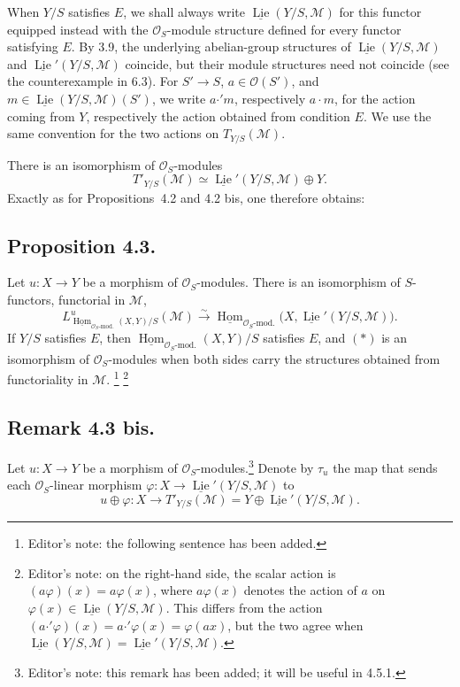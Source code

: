 When \(Y/S\) satisfies \(E\), we shall always write
\(\underline{\operatorname{Lie}}(Y/S,\mathcal M)\) for this functor
equipped instead with the \(\mathcal O_S\)-module structure defined for
every functor satisfying \(E\). By 3.9, the underlying abelian-group
structures of
\(\underline{\operatorname{Lie}}(Y/S,\mathcal M)\) and
\(\underline{\operatorname{Lie}}'(Y/S,\mathcal M)\) coincide, but their
module structures need not coincide (see the counterexample in 6.3). For
\(S'\to S\), \(a\in\mathcal O(S')\), and
\(m\in\underline{\operatorname{Lie}}(Y/S,\mathcal M)(S')\), we write
\(a\mathbin{\cdot'}m\), respectively \(a\cdot m\), for the action coming
from \(Y\), respectively the action obtained from condition \(E\). We use
the same convention for the two actions on \(T_{Y/S}(\mathcal M)\).

There is an isomorphism of \(\mathcal O_S\)-modules
\[
 T'_{Y/S}(\mathcal M)
 \simeq \underline{\operatorname{Lie}}'(Y/S,\mathcal M)\oplus Y.
\]
Exactly as for Propositions~4.2 and 4.2 bis, one therefore obtains:

\subsection*{Proposition 4.3.}
Let \(u:X\to Y\) be a morphism of \(\mathcal O_S\)-modules. There is an
isomorphism of \(S\)-functors, functorial in \(\mathcal M\),
\begin{equation}
 L^u_{\underline{\operatorname{Hom}}_{\mathcal O_S\text{-mod.}}(X,Y)/S}
   (\mathcal M)
 \xrightarrow{\sim}
 \underline{\operatorname{Hom}}_{\mathcal O_S\text{-mod.}}
   \bigl(X,\underline{\operatorname{Lie}}'(Y/S,\mathcal M)\bigr).
 \tag{*}
\end{equation}
If \(Y/S\) satisfies \(E\), then
\(\underline{\operatorname{Hom}}_{\mathcal O_S\text{-mod.}}(X,Y)/S\)
satisfies \(E\), and \((*)\) is an isomorphism of
\(\mathcal O_S\)-modules when both sides carry the structures obtained
from functoriality in \(\mathcal M\).
\footnote{Editor's note: the following sentence has been added.}
\footnote{Editor's note: on the right-hand side, the scalar action is
\((a\varphi)(x)=a\varphi(x)\), where \(a\varphi(x)\) denotes the action
of \(a\) on \(\varphi(x)\in
\underline{\operatorname{Lie}}(Y/S,\mathcal M)\). This differs from the
action \((a\mathbin{\cdot'}\varphi)(x)
=a\mathbin{\cdot'}\varphi(x)=\varphi(ax)\), but the two agree when
\(\underline{\operatorname{Lie}}(Y/S,\mathcal M)
=\underline{\operatorname{Lie}}'(Y/S,\mathcal M)\).}

\subsection*{Remark 4.3 bis.}
Let \(u:X\to Y\) be a morphism of
\(\mathcal O_S\)-modules.\footnote{Editor's note: this remark has been
added; it will be useful in 4.5.1.} Denote by
\(\tau_u\) the map that sends each \(\mathcal O_S\)-linear morphism
\(\varphi:X\to\underline{\operatorname{Lie}}'(Y/S,\mathcal M)\) to
\[
 u\oplus\varphi:X\longrightarrow
 T'_{Y/S}(\mathcal M)
 =Y\oplus\underline{\operatorname{Lie}}'(Y/S,\mathcal M).
 \]

